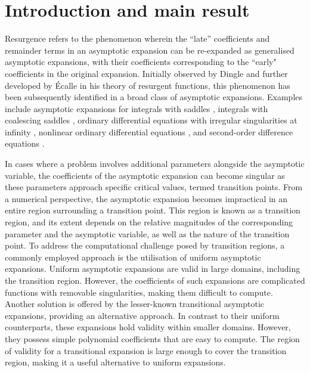 \section{Introduction and main result}

Resurgence refers to the phenomenon wherein the ``late'' coefficients and remainder terms in an asymptotic expansion can be re-expanded as generalised asymptotic expansions, with their coefficients corresponding to the ``early" coefficients in the original expansion. Initially observed by Dingle \cite{Dingle1973} and further developed by \'Ecalle \cite{Ecalle1981,Ecalle1981-II,Ecalle1981-III} in his theory of resurgent functions, this phenomenon has been subsequently identified in a broad class of asymptotic expansions. Examples include asymptotic expansions for integrals with saddles \cite{Bennett2018,Berry1991,Howls1997}, integrals with coalescing saddles \cite{OldeDaalhuis2000}, ordinary differential equations with irregular singularities at infinity \cite{Murphy1997, OldeDaalhuis1998b}, nonlinear ordinary differential equations \cite{OldeDaalhuis2005a,OldeDaalhuis2005b}, and second-order difference equations \cite{OldeDaalhuis2004}.

In cases where a problem involves additional parameters alongside the asymptotic variable, the coefficients of the asymptotic expansion can become singular as these parameters approach specific critical values, termed transition points. From a numerical perspective, the asymptotic expansion becomes impractical in an entire region surrounding a transition point. This region is known as a transition region, and its extent depends on the relative magnitudes of the corresponding parameter and the asymptotic variable, as well as the nature of the transition point. To address the computational challenge posed by transition regions, a commonly employed approach is the utilisation of uniform asymptotic expansions. Uniform asymptotic expansions are valid in large domains, including the transition region. However, the coefficients of such expansions are complicated functions with removable singularities, making them difficult to compute. Another solution is offered by the lesser-known transitional asymptotic expansions, providing an alternative approach. In contrast to their uniform counterparts, these expansions hold validity within smaller domains. However, they possess simple polynomial coefficients that are easy to compute. The region of validity for a transitional expansion is large enough to cover the transition region, making it a useful alternative to uniform expansions.

